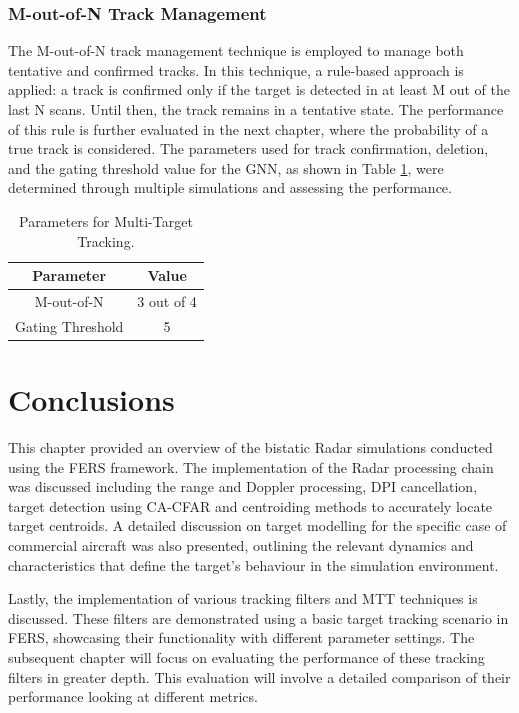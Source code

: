 \subsubsection{M-out-of-N Track Management}

The M-out-of-N track management technique is employed to manage both tentative and confirmed tracks. In this technique, a rule-based approach is applied: a track is confirmed only if the target is detected in at least M out of the last N scans. Until then, the track remains in a tentative state. The performance of this rule is further evaluated in the next chapter, where the probability of a true track is considered. The parameters used for track confirmation, deletion, and the gating threshold value for the \ac{GNN}, as shown in Table \ref{paramTable}, were determined through multiple simulations and assessing the performance.



\begin{table}[H]
    \centering
    \caption{Parameters for Multi-Target Tracking.}
    \begin{tabular}{c|c}
        \toprule
        Parameter & Value \\
        \midrule
        M-out-of-N & 3 out of 4 \\
        Gating Threshold & 5 \\
        \bottomrule
    \end{tabular}
    \label{paramTable}
\end{table}

\section{Conclusions}
This chapter provided an overview of the bistatic \ac{Radar} simulations conducted using the \ac{FERS} framework. The implementation of the \ac{Radar} processing chain was discussed including the range and Doppler processing, \ac{DPI} cancellation, target detection using \ac{CA-CFAR} and centroiding methods to accurately locate target centroids. A detailed discussion on target modelling for the specific case of commercial aircraft was also presented, outlining the relevant dynamics and characteristics that define the target's behaviour in the simulation environment.

Lastly, the implementation of various tracking filters and \ac{MTT} techniques is discussed. These filters are demonstrated using a basic target tracking scenario in \ac{FERS}, showcasing their functionality with different parameter settings. The subsequent chapter will focus on evaluating the performance of these tracking filters in greater depth. This evaluation will involve a detailed comparison of their performance looking at different metrics.

